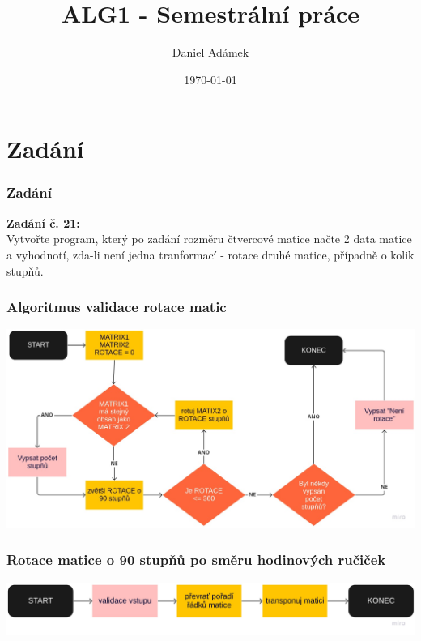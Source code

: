 \documentclass{beamer}
\title[Titulek]{ALG1 - Semestrální práce}
\author{Daniel Adámek}
\institute[Technická univerzita v Liverci]
{}
\date{\today} %
\begin{document}
\begin{frame}
\titlepage %
\end{frame}

\section{Zadání}
\begin{frame}
\frametitle{Zadání}
    \textbf{Zadání č. 21:} \\
    Vytvořte program, který po zadání rozměru čtvercové matice načte 2 data matice a vyhodnotí, zda-li není jedna
    tranformací - rotace druhé matice, případně o kolik stupňů.
\end{frame}
\begin{frame}
\frametitle{Algoritmus validace rotace matic}
    \includegraphics[scale=0.215]{alg1-flowchart}
\end{frame}
\begin{frame}
    \frametitle{Rotace matice o 90 stupňů \small{po směru hodinových ručiček}}
    \includegraphics[scale=0.11]{alg1-rotate-flowchart}
\end{frame}
\end{document}
